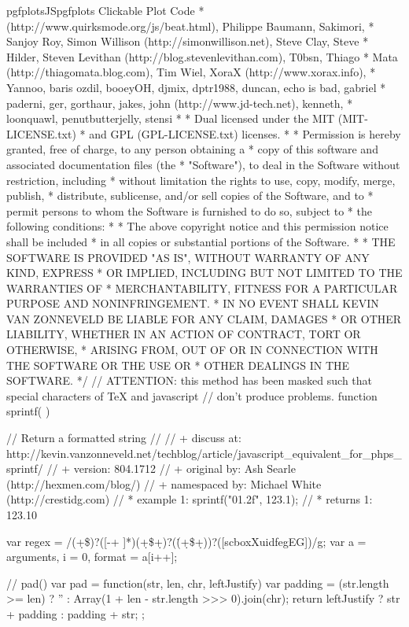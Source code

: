 {{\begin{insDLJS}[processAnnotatedPlot]{pgfplotsJS}{pgfplots Clickable Plot Code}
 * (http://www.quirksmode.org/js/beat.html), Philippe Baumann, Sakimori,
 * Sanjoy Roy, Simon Willison (http://simonwillison.net), Steve Clay, Steve
 * Hilder, Steven Levithan (http://blog.stevenlevithan.com), T0bsn, Thiago
 * Mata (http://thiagomata.blog.com), Tim Wiel, XoraX (http://www.xorax.info),
 * Yannoo, baris ozdil, booeyOH, djmix, dptr1988, duncan, echo is bad, gabriel
 * paderni, ger, gorthaur, jakes, john (http://www.jd-tech.net), kenneth,
 * loonquawl, penutbutterjelly, stensi
 * 
 * Dual licensed under the MIT (MIT-LICENSE.txt)
 * and GPL (GPL-LICENSE.txt) licenses.
 * 
 * Permission is hereby granted, free of charge, to any person obtaining a
 * copy of this software and associated documentation files (the
 * "Software"), to deal in the Software without restriction, including
 * without limitation the rights to use, copy, modify, merge, publish,
 * distribute, sublicense, and/or sell copies of the Software, and to
 * permit persons to whom the Software is furnished to do so, subject to
 * the following conditions:
 * 
 * The above copyright notice and this permission notice shall be included
 * in all copies or substantial portions of the Software.
 * 
 * THE SOFTWARE IS PROVIDED "AS IS", WITHOUT WARRANTY OF ANY KIND, EXPRESS
 * OR IMPLIED, INCLUDING BUT NOT LIMITED TO THE WARRANTIES OF
 * MERCHANTABILITY, FITNESS FOR A PARTICULAR PURPOSE AND NONINFRINGEMENT.
 * IN NO EVENT SHALL KEVIN VAN ZONNEVELD BE LIABLE FOR ANY CLAIM, DAMAGES
 * OR OTHER LIABILITY, WHETHER IN AN ACTION OF CONTRACT, TORT OR OTHERWISE,
 * ARISING FROM, OUT OF OR IN CONNECTION WITH THE SOFTWARE OR THE USE OR
 * OTHER DEALINGS IN THE SOFTWARE.
 */ 
// ATTENTION: this method has been masked such that special characters of TeX and javascript 
// don't produce problems.
function sprintf( ) {
    // Return a formatted string
    // 
    // +    discuss at: http://kevin.vanzonneveld.net/techblog/article/javascript_equivalent_for_phps_sprintf/
    // +       version: 804.1712
    // +   original by: Ash Searle (http://hexmen.com/blog/)
    // + namespaced by: Michael White (http://crestidg.com)
    // *     example 1: sprintf("\pgfplotsPERCENT01.2f", 123.1);
    // *     returns 1: 123.10

    var regex = /\pgfplotsPERCENT\pgfplotsPERCENT\pgfplotsVERTBAR\pgfplotsPERCENT(\d+\$)?([-+ ]*)(\*\d+\$\pgfplotsVERTBAR\*\pgfplotsVERTBAR\d+)?(\.(\*\d+\$\pgfplotsVERTBAR\*\pgfplotsVERTBAR\d+))?([scboxXuidfegEG])/g;
    var a = arguments, i = 0, format = a[i++];

    // pad()
    var pad = function(str, len, chr, leftJustify) {
        var padding = (str.length >= len) ? '' : Array(1 + len - str.length >>> 0).join(chr);
        return leftJustify ? str + padding : padding + str;
    };

}
\end{insDLJS}}}
